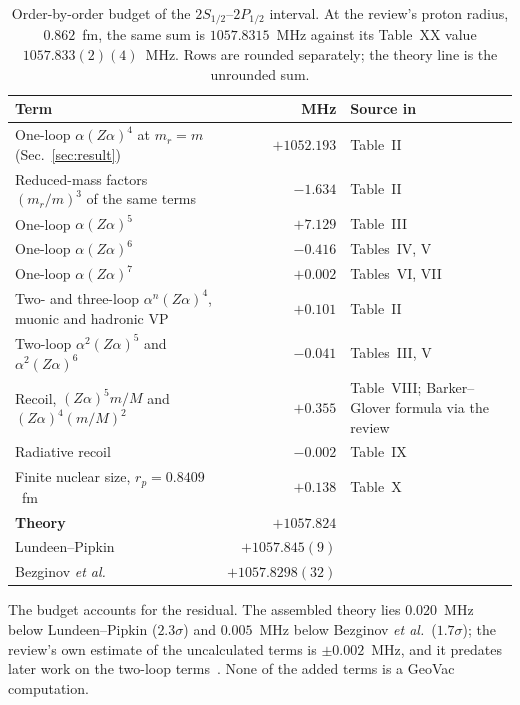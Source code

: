 \documentclass[11pt]{article}
\begin{document}
\begin{table}[h]
\centering
\begin{tabular}{l r l}
\toprule
Term & MHz & Source in~\cite{eides2001} \\
\midrule
One-loop $\alpha(Z\alpha)^4$ at $m_r = m$ (Sec.~\ref{sec:result}) & $+1052.193$ & Table~II \\
Reduced-mass factors $(m_r/m)^3$ of the same terms & $-1.634$ & Table~II \\
One-loop $\alpha(Z\alpha)^5$ & $+7.129$ & Table~III \\
One-loop $\alpha(Z\alpha)^6$ & $-0.416$ & Tables~IV, V \\
One-loop $\alpha(Z\alpha)^7$ & $+0.002$ & Tables~VI, VII \\
Two- and three-loop $\alpha^n(Z\alpha)^4$, muonic and hadronic VP & $+0.101$ & Table~II \\
Two-loop $\alpha^2(Z\alpha)^5$ and $\alpha^2(Z\alpha)^6$ & $-0.041$ & Tables~III, V \\
Recoil, $(Z\alpha)^5 m/M$ and $(Z\alpha)^4 (m/M)^2$ & $+0.355$ & Table~VIII; Barker--Glover formula via the review \\
Radiative recoil & $-0.002$ & Table~IX \\
Finite nuclear size, $r_p = 0.8409$~fm & $+0.138$ & Table~X \\
\midrule
\textbf{Theory} & $+1057.824$ & \\
Lundeen--Pipkin~\cite{lundeen_pipkin1981} & $+1057.845(9)$ & \\
Bezginov \emph{et al.}~\cite{bezginov2019} & $+1057.8298(32)$ & \\
\bottomrule
\end{tabular}
\caption{Order-by-order budget of the $2S_{1/2}$--$2P_{1/2}$ interval.
At the review's proton radius, $0.862$~fm, the same sum is
$1057.8315$~MHz against its Table~XX value $1057.833(2)(4)$~MHz.
Rows are rounded separately; the theory line is the unrounded sum.}
\label{tab:budget}
\end{table}

The budget accounts for the residual.  The assembled theory lies
$0.020$~MHz below Lundeen--Pipkin ($2.3\sigma$) and $0.005$~MHz below
Bezginov \emph{et al.}\ ($1.7\sigma$); the review's own estimate of the
uncalculated terms is $\pm 0.002$~MHz, and it predates later work on
the two-loop terms~\cite{yerokhin2024_two_loop_se}.  None of the added
terms is a GeoVac computation.

\end{document}
